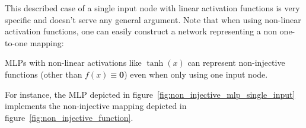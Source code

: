 \documentclass[../../main.tex]{subfiles}
\begin{document}
\begin{critique}
    This described case of a single input node with linear activation functions is very specific and doesn't serve any general argument. Note that when using non-linear activation functions, one can easily construct a network representing a non one-to-one mapping:

    \begin{example}
        MLPs with non-linear activations like $\tanh(x)$ can represent non-injective functions (other than $f(x) \equiv \bm{0}$) even when only using one input node.
        
        For instance, the MLP depicted in figure~\ref{fig:non_injective_mlp_single_input} implements the non-injective mapping depicted in figure~\ref{fig:non_injective_function}.

        \begin{center}
            \label{fig:non_injective_mlp_single_input}
        \end{center}


\end{example}
\end{critique}
\end{document}
